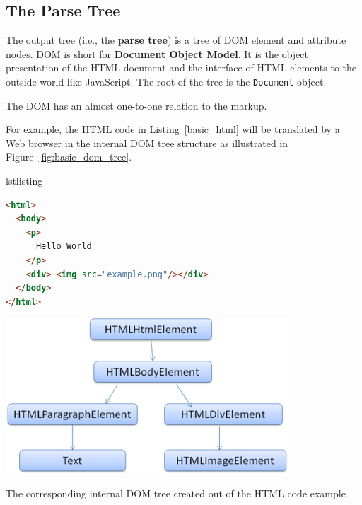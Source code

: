 \documentclass[a4paper, justified, notoc]{tufte-handout} %
\makeatletter
\newenvironment{listing}[1][htbp]
  {\ifvmode\else\unskip\fi\begin{@tufte@float}[#1]{lstlisting}{}}
  {\end{@tufte@float} } %
\makeatother
\begin{document}
\subsection{The Parse Tree} %
\label{sub:the_parse_tree}

The output tree (i.e., the \textbf{parse tree}) is a tree of DOM element and attribute nodes. DOM is short for \textbf{Document Object Model}. It is the object presentation of the HTML document and the interface of HTML elements to the outside world like JavaScript. 
The root of the tree is the \texttt{Document} object.

The DOM has an almost one-to-one relation to the markup.

For example, the HTML code in Listing~\ref{basic_html} will be translated by a Web browser in the internal DOM tree structure as illustrated in Figure~\ref{fig:basic_dom_tree}.

\begin{listing}
\begin{lstlisting}[language=HTML]
<html>
  <body>
    <p>
      Hello World
    </p>
    <div> <img src="example.png"/></div>
  </body>
</html>
\end{lstlisting}
	\label{basic_html}
\end{listing}

\begin{marginfigure}[-15em]
    \includegraphics{./figures/basic_dom_tree.png}
    \caption{The corresponding internal DOM tree created out of the HTML code example}
    \label{fig:basic_dom_tree}
\end{marginfigure}


\end{document}
